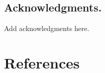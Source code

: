 \subsection{Acknowledgments.}
Add acknowledgments here.

\section*{References}
\printbibliography[heading=none]
